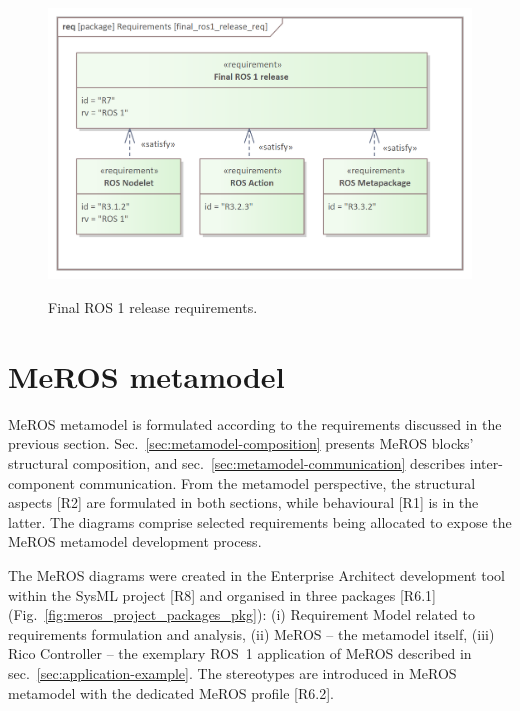 \documentclass[11pt,oneside,a4paper]{article}
\begin{document}
	\begin{figure}[H]
		\centering
		\begin{center}
			{\includegraphics[scale=1.0]{img/requirement_pkg/final_ros1_release_req.png}}
		\end{center}
		\caption{Final ROS 1 release requirements.} 
		\label{fig:final_ros1_release_req}
	\end{figure}
	
	
	
\section{MeROS metamodel}
\label{sec:metamodel}
	
	MeROS metamodel is formulated according to the requirements discussed in the previous section. Sec.~\ref{sec:metamodel-composition} presents MeROS blocks' structural composition, and sec.~\ref{sec:metamodel-communication} describes inter-component communication. From the metamodel perspective, the structural aspects [R2] are formulated in both sections, while behavioural [R1] is in the latter. The diagrams comprise selected requirements being allocated to expose the MeROS metamodel development process. 
	
	The MeROS diagrams were created in the Enterprise Architect development tool within the SysML project [R8] and organised in three packages [R6.1] (Fig.~\ref{fig:meros_project_packages_pkg}): (i) Requirement Model related to requirements formulation and analysis, (ii) MeROS -- the metamodel itself, (iii) Rico Controller -- the exemplary ROS~1 application of MeROS described in sec.~\ref{sec:application-example}. The stereotypes are introduced in MeROS metamodel with the dedicated MeROS profile [R6.2].
	
\end{document}

